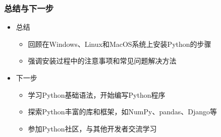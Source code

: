 \begin{frame}
    \frametitle{总结与下一步}
    \begin{itemize}
        \item 总结
            \begin{itemize}
                \item 回顾在Windows、Linux和MacOS系统上安装Python的步骤
                \item 强调安装过程中的注意事项和常见问题解决方法
            \end{itemize}
        \item 下一步
            \begin{itemize}
                \item 学习Python基础语法，开始编写Python程序
                \item 探索Python丰富的库和框架，如NumPy、pandas、Django等
                \item 参加Python社区，与其他开发者交流学习
            \end{itemize}
    \end{itemize}
\end{frame}

